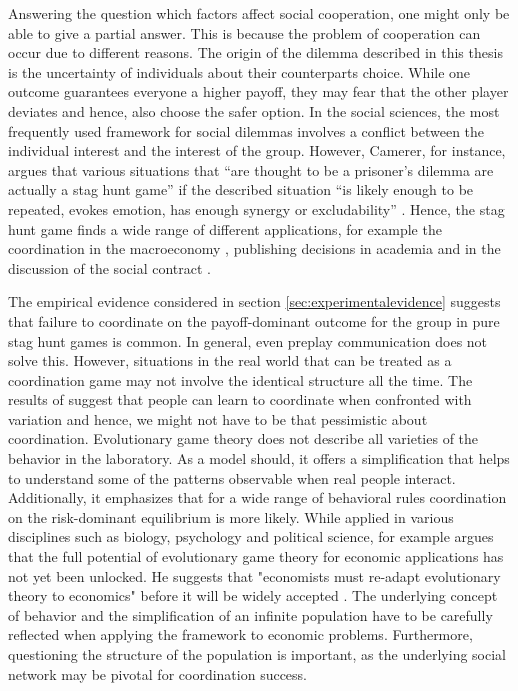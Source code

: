 
Answering the question which factors affect social cooperation, one might
only be able to give a partial answer. 
This is because the problem of cooperation can occur due to different
reasons.
The origin of the dilemma described in this thesis is the uncertainty 
of individuals about their counterparts choice. 
While one outcome guarantees everyone a higher 
payoff, they may fear that the other player deviates and hence, also choose 
the safer option. 
In the social sciences, the most frequently used framework for social dilemmas
involves a conflict between the individual interest and the interest of 
the group.
However, Camerer, for instance, argues that various situations that 
``are thought to be a prisoner's 
dilemma are actually a stag hunt game'' 
if the described situation ``is likely enough to be repeated, evokes emotion, 
has enough synergy or excludability'' 
\parencite[376-377]{camerer_behavioral_2003}. Hence, the 
stag hunt game finds a wide range of different applications,
for example the coordination in the macroeconomy \parencite{bryant_coordination_1994}, 
publishing decisions in academia \parencite{hanauske_evolutionare_2011} and
in the discussion of the social contract \parencite{skyrms_stag_2004}.

The empirical evidence considered in section \ref{sec:experimentalevidence}
suggests that failure to coordinate on the payoff-dominant 
outcome for the group in pure stag hunt games is common. 
In general, even preplay communication does not solve this.
However, situations in the real world that can be treated as a coordination
game may not involve the identical structure all the time. The
results of \textcite{rankin_strategic_2000} suggest that people can learn 
to coordinate when confronted with variation and hence, we might not
have to be that pessimistic about coordination.
Evolutionary game theory does not describe all varieties of the 
behavior in the laboratory. As a model should, it offers a simplification
that helps to understand some of the patterns observable when real people
interact. Additionally, it emphasizes that for a wide range
of behavioral rules coordination on the risk-dominant equilibrium
is more likely. While applied in various disciplines such as biology, 
psychology and political science, for example 
\textcite{friedman_economic_1998} argues that the full potential
of evolutionary game theory for economic applications 
has not yet been unlocked. He suggests that "economists must re-adapt
evolutionary theory to economics" before it will be widely accepted 
\parencite[18]{friedman_economic_1998}. The underlying concept of behavior and
the simplification of an infinite population have to be carefully reflected
when applying the framework to economic problems. Furthermore, questioning
the structure of the population is important, as the underlying social
network may be pivotal for coordination success.
